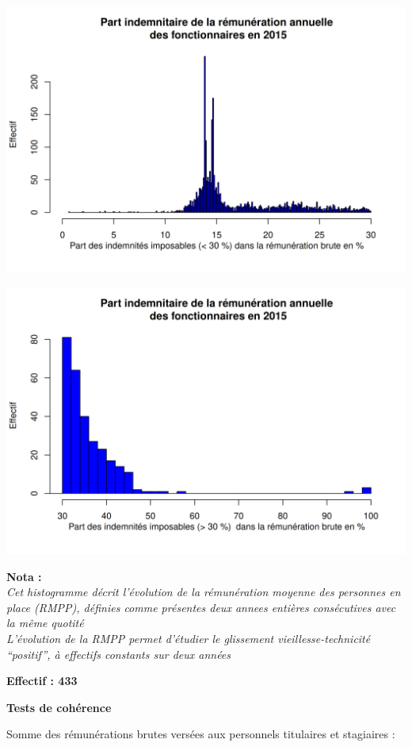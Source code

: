 \includegraphics{altair_files/figure-latex/unnamed-chunk-43-5.png}

\includegraphics{altair_files/figure-latex/unnamed-chunk-43-6.png}

\textbf{Nota :}\\
\emph{Cet histogramme décrit l'évolution de la rémunération moyenne des
personnes en place (RMPP), définies comme présentes deux annees entières
consécutives avec la même quotité}\\
\emph{L'évolution de la RMPP permet d'étudier le glissement
vieillesse-technicité ``positif'', à effectifs constants sur deux
années}

\textbf{Effectif : 433 }

\textbf{Tests de cohérence}

Somme des rémunérations brutes versées aux personnels titulaires et
stagiaires :

